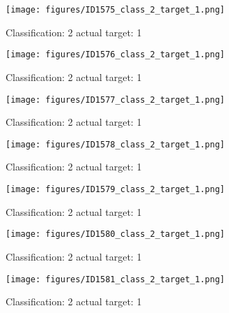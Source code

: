 \begin{figure}[h!]
\begin{center}
\texttt{[image: figures/ID1575\_class\_2\_target\_1.png]}
\end{center}
\caption{ Classification: 2 actual target: 1}
\label{fig:ID1575_class_2_target_1}
\end{figure}
\begin{figure}[h!]
\begin{center}
\texttt{[image: figures/ID1576\_class\_2\_target\_1.png]}
\end{center}
\caption{ Classification: 2 actual target: 1}
\label{fig:ID1576_class_2_target_1}
\end{figure}
\begin{figure}[h!]
\begin{center}
\texttt{[image: figures/ID1577\_class\_2\_target\_1.png]}
\end{center}
\caption{ Classification: 2 actual target: 1}
\label{fig:ID1577_class_2_target_1}
\end{figure}
\begin{figure}[h!]
\begin{center}
\texttt{[image: figures/ID1578\_class\_2\_target\_1.png]}
\end{center}
\caption{ Classification: 2 actual target: 1}
\label{fig:ID1578_class_2_target_1}
\end{figure}
\begin{figure}[h!]
\begin{center}
\texttt{[image: figures/ID1579\_class\_2\_target\_1.png]}
\end{center}
\caption{ Classification: 2 actual target: 1}
\label{fig:ID1579_class_2_target_1}
\end{figure}
\begin{figure}[h!]
\begin{center}
\texttt{[image: figures/ID1580\_class\_2\_target\_1.png]}
\end{center}
\caption{ Classification: 2 actual target: 1}
\label{fig:ID1580_class_2_target_1}
\end{figure}
\begin{figure}[h!]
\begin{center}
\texttt{[image: figures/ID1581\_class\_2\_target\_1.png]}
\end{center}
\caption{ Classification: 2 actual target: 1}
\label{fig:ID1581_class_2_target_1}
\end{figure}
